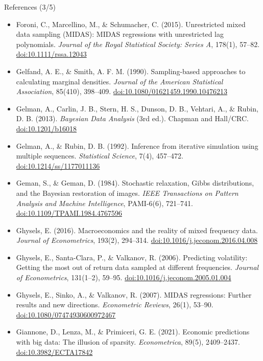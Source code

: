 \begin{frame}{References (3/5)}
\itemsize{\tiny}
\begin{itemize}
    \item Foroni, C., Marcellino, M., \& Schumacher, C. (2015). Unrestricted mixed data sampling (MIDAS): MIDAS regressions with unrestricted lag polynomials. \textit{Journal of the Royal Statistical Society: Series A}, 178(1), 57--82. \href{https://doi.org/10.1111/rssa.12043}{doi:10.1111/rssa.12043}
    \item Gelfand, A. E., \& Smith, A. F. M. (1990). Sampling-based approaches to calculating marginal densities. \textit{Journal of the American Statistical Association}, 85(410), 398--409. \href{https://doi.org/10.1080/01621459.1990.10476213}{doi:10.1080/01621459.1990.10476213}
    \item Gelman, A., Carlin, J. B., Stern, H. S., Dunson, D. B., Vehtari, A., \& Rubin, D. B. (2013). \textit{Bayesian Data Analysis} (3rd ed.). Chapman and Hall/CRC. \href{https://doi.org/10.1201/b16018}{doi:10.1201/b16018}
    \item Gelman, A., \& Rubin, D. B. (1992). Inference from iterative simulation using multiple sequences. \textit{Statistical Science}, 7(4), 457--472. \href{https://doi.org/10.1214/ss/1177011136}{doi:10.1214/ss/1177011136}
    \item Geman, S., \& Geman, D. (1984). Stochastic relaxation, Gibbs distributions, and the Bayesian restoration of images. \textit{IEEE Transactions on Pattern Analysis and Machine Intelligence}, PAMI-6(6), 721--741. \href{https://doi.org/10.1109/TPAMI.1984.4767596}{doi:10.1109/TPAMI.1984.4767596}
    \item Ghysels, E. (2016). Macroeconomics and the reality of mixed frequency data. \textit{Journal of Econometrics}, 193(2), 294--314. \href{https://doi.org/10.1016/j.jeconom.2016.04.008}{doi:10.1016/j.jeconom.2016.04.008}
    \item Ghysels, E., Santa-Clara, P., \& Valkanov, R. (2006). Predicting volatility: Getting the most out of return data sampled at different frequencies. \textit{Journal of Econometrics}, 131(1--2), 59--95. \href{https://doi.org/10.1016/j.jeconom.2005.01.004}{doi:10.1016/j.jeconom.2005.01.004}
    \item Ghysels, E., Sinko, A., \& Valkanov, R. (2007). MIDAS regressions: Further results and new directions. \textit{Econometric Reviews}, 26(1), 53--90. \href{https://doi.org/10.1080/07474930600972467}{doi:10.1080/07474930600972467}
    \item Giannone, D., Lenza, M., \& Primiceri, G. E. (2021). Economic predictions with big data: The illusion of sparsity. \textit{Econometrica}, 89(5), 2409--2437. \href{https://doi.org/10.3982/ECTA17842}{doi:10.3982/ECTA17842}

\end{itemize}
\end{frame}
